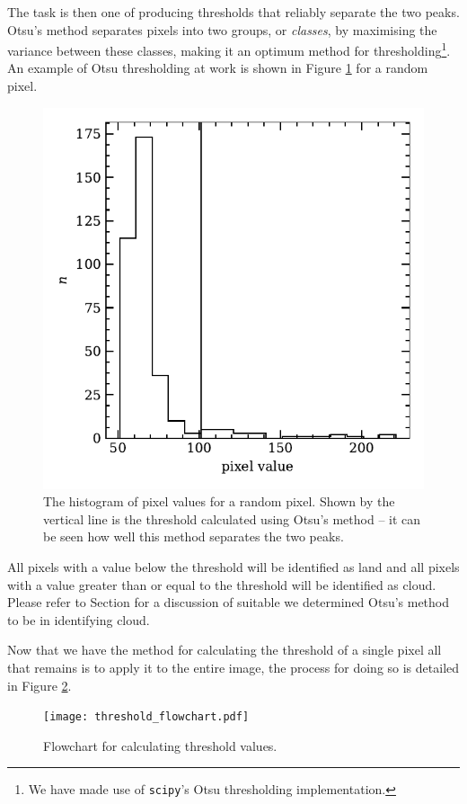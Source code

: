 The task is then one of producing thresholds that reliably separate the two
peaks. Otsu's method \citep{gonzalez2008} separates pixels into two groups, or
\emph{classes}, by maximising the variance between these classes, making it an
optimum method for thresholding\footnote{We have made use of \texttt{scipy}'s
  Otsu thresholding implementation.}. An example of Otsu thresholding at work is
shown in Figure \ref{fig:otsu} for a random pixel.
\begin{figure}
  \centering
    \includegraphics[width=0.8\linewidth]{figures/otsu_bimodal.pdf}
    \caption{The histogram of pixel values for a random pixel. Shown by the
      vertical line is the threshold calculated using Otsu's method -- it can be
      seen how well this method separates the two peaks.}
    \label{fig:otsu}
\end{figure}
All pixels with a value below the threshold will be identified as land and all
pixels with a value greater than or equal to the threshold will be identified as
cloud. Please refer to Section \label{sec:disc:thresh} for a discussion of
suitable we determined Otsu's method to be in identifying cloud.

Now that we have the method for calculating the threshold of a single
pixel all that remains is to apply it to the entire image, the process for doing
so is detailed in Figure \ref{fig:thr_fc}.
\begin{figure}[t!]
  \centering
  \texttt{[image: threshold\_flowchart.pdf]}
  \caption{Flowchart for calculating threshold values.}
  \label{fig:thr_fc}
\end{figure}


